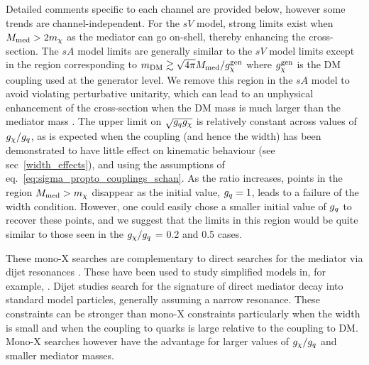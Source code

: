 Detailed comments specific to each channel are provided below, however some trends are channel-independent. For the $sV$ model, strong limits exist when $M_{\mathrm{med}} > 2 m_{\chi}$ as the mediator can go on-shell, thereby enhancing the cross-section. The $sA$ model limits are generally similar to the $sV$ model limits except in the region corresponding to $m_{\mathrm{DM}} \gtrsim \sqrt{4\pi} M_{\mathrm{med}} / g^{\rm gen}_\chi$ where $g^{\rm gen}_\chi$ is the DM coupling used at the generator level. We remove this region in the $sA$ model to avoid violating perturbative unitarity, which can lead to an unphysical enhancement of the cross-section when the DM mass is much larger than the mediator mass \cite{Bell:2015rdw}. The upper limit on $\sqrt{g_q g_{\chi}}$ is relatively constant across values of $g_{\chi} / g_q$, as is expected when the coupling (and hence the width) has been demonstrated to have little effect on kinematic behaviour (see sec~\ref{width_effects}), and using the assumptions of eq.~\ref{eq:sigma_propto_couplings_schan}. As the ratio increases, points in the region $M_{\mathrm{med}} > m_{\chi}$ disappear as the initial value, $g_q = 1$, leads to a failure of the width condition. However, one could easily chose a smaller initial value of $g_q$ to recover these points, and we suggest that the limits in this region would be quite similar to those seen in the $g_{\chi} / g_q$ = 0.2 and 0.5 cases.


These mono-X searches are complementary to direct searches for the mediator via dijet resonances \cite{Chatrchyan:2013qha, Aad:2014aqa, Aaltonen:2008dn, Khachatryan:2015sja}. These have been used to study simplified models in, for example, \cite{An:2012va, Zurek:tchannel}. Dijet studies search for the signature of direct mediator decay into standard model particles, generally assuming a narrow resonance. These constraints can be stronger than mono-X constraints particularly when the width is small and when the coupling to quarks is large relative to the coupling to DM. Mono-X searches however have the advantage for larger values of $g_{\chi}/g_q$ and smaller mediator masses.

